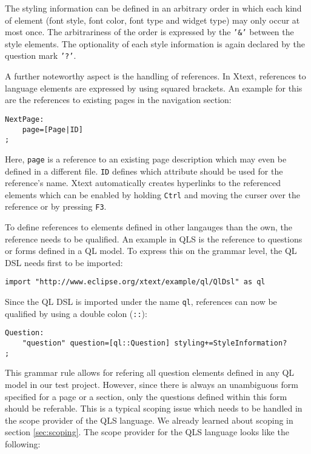 The styling information can be defined in an arbitrary order in which each kind 
of element (font style, font color, font type and widget type) may only occur at 
most once. The arbitrariness of the order is expressed by the \texttt{'\&'} between
the style elements. The optionality of each style information is again declared by
the question mark \texttt{'?'}.

A further noteworthy aspect is the handling of references. In Xtext, references 
to language elements are expressed by using squared brackets. An example for this are the  
references to existing pages in the navigation section:

\begin{lstlisting}[language=Xtext]
NextPage:
	page=[Page|ID]
;
\end{lstlisting}

Here, \texttt{page} is a reference to an existing page description which may even
be defined in a different file. \texttt{ID} defines which attribute should be used
for the reference's name. Xtext automatically creates hyperlinks to the referenced
elements which can be enabled by holding \texttt{Ctrl} and moving the curser over the
reference or by pressing \texttt{F3}.

To define references to elements defined in other langauges than the own,
the reference needs to be qualified. An example in QLS is the reference to questions
or forms defined in a QL model. To express this on the grammar level, the QL DSL
needs first to be imported:

\begin{lstlisting}[language=Xtext]
import "http://www.eclipse.org/xtext/example/ql/QlDsl" as ql
\end{lstlisting}

Since the QL DSL is imported under the name \texttt{ql}, references can now be 
qualified by using a double colon (\texttt{::}):

\begin{lstlisting}[language=Xtext]
Question:
	"question" question=[ql::Question] styling+=StyleInformation?	
;
\end{lstlisting}

This grammar rule allows for refering all question elements defined in
any QL model in our test project. However, since there is always an unambiguous
form specified for a page or a section, only the questions defined within this 
form should be referable. This is a typical scoping issue which needs to be 
handled in the scope provider of the QLS language. We already learned about scoping
in section \ref{sec:scoping}. The scope provider for the QLS language looks like
the following:


